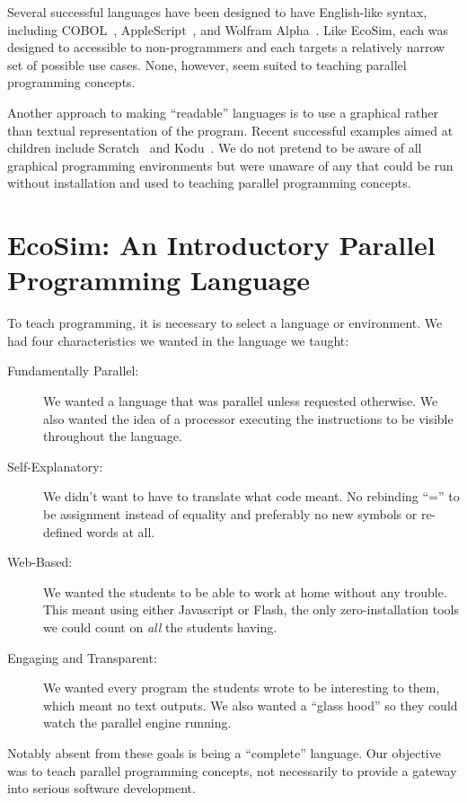 \documentclass{sig-alternate}
\newcommand{\EcoSim}{EcoSim}
\begin{document}
Several successful languages have been designed to have English-like syntax,
including COBOL~\cite{COBOL59}, AppleScript~\cite{AppleScript}, and Wolfram Alpha~\cite{WolframAlpha}.
Like \EcoSim{}, each was designed to accessible to non-programmers
and each targets a relatively narrow set of possible use cases.
None, however, seem suited to teaching parallel programming concepts.

Another approach to making ``readable'' languages 
is to use a graphical rather than textual representation of the program.
Recent successful examples aimed at children include Scratch~\cite{Scratch} and Kodu~\cite{Kodu}.
We do not pretend to be aware of all graphical programming environments
but were unaware of any that could be run without installation
and used to teaching parallel programming concepts.


\section{\EcoSim{}: An Introductory Parallel Programming Language}
To teach programming, it is necessary to select a language or environment.
We had four characteristics we wanted in the language we taught:
\begin{description}
	\item[Fundamentally Parallel:]
		We wanted a language that was parallel unless requested otherwise.
		We also wanted the idea of a processor executing the instructions
		to be visible throughout the language.
	\item[Self-Explanatory:]
		We didn't want to have to translate what code meant.
		No rebinding ``='' to be assignment instead of equality
		and preferably no new symbols or re-defined words at all.
	\item[Web-Based:]
		We wanted the students to be able to work at home without any trouble.
		This meant using either Javascript or Flash, 
		the only zero-installation tools we could count on \emph{all} the students having.
	\item[Engaging and Transparent:]
		We wanted every program the students wrote to be interesting to them, which meant no text outputs.
		We also wanted a ``glass hood'' so they could watch the parallel engine running.
\end{description}
Notably absent from these goals is being a ``complete'' language.
Our objective was to teach parallel programming concepts,
not necessarily to provide a gateway into serious software development.
\end{document}
